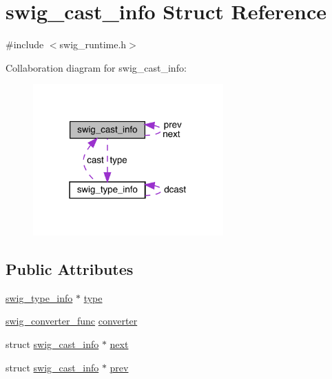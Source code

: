\hypertarget{structswig__cast__info}{}\section{swig\+\_\+cast\+\_\+info Struct Reference}
\label{structswig__cast__info}


{\ttfamily \#include $<$swig\+\_\+runtime.\+h$>$}



Collaboration diagram for swig\+\_\+cast\+\_\+info\+:\nopagebreak
\begin{figure}[H]
\begin{center}
\leavevmode
\includegraphics[width=207pt]{structswig__cast__info__coll__graph}
\end{center}
\end{figure}
\subsection*{Public Attributes}
\begin{DoxyCompactItemize}
\item 
\mbox{\hyperlink{structswig__type__info}{swig\+\_\+type\+\_\+info}} $\ast$ \mbox{\hyperlink{structswig__cast__info_a1c9023a301c8d6806209f4e10df6e9e0}{type}}
\item 
\mbox{\hyperlink{swig__runtime_8h_a9a51597c7c2041da303a65468011f59b}{swig\+\_\+converter\+\_\+func}} \mbox{\hyperlink{structswig__cast__info_aa630fddfbb1bf9c97a03f9479ba32f76}{converter}}
\item 
struct \mbox{\hyperlink{structswig__cast__info}{swig\+\_\+cast\+\_\+info}} $\ast$ \mbox{\hyperlink{structswig__cast__info_ae79c6fa058a9d908bbdac14db0c9db5e}{next}}
\item 
struct \mbox{\hyperlink{structswig__cast__info}{swig\+\_\+cast\+\_\+info}} $\ast$ \mbox{\hyperlink{structswig__cast__info_afc685bcf38a5a06c6601775138c5999c}{prev}}
\end{DoxyCompactItemize}


